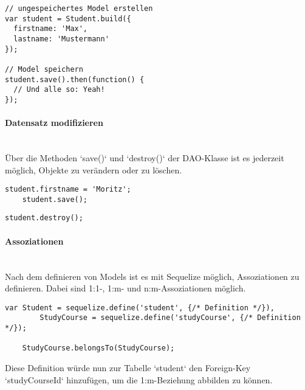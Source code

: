 \begin{lstlisting}[caption=Datensatz anlegen (Sequelize)]
// ungespeichertes Model erstellen
var student = Student.build({
  firstname: 'Max',
  lastname: 'Mustermann'
});

// Model speichern
student.save().then(function() {
  // Und alle so: Yeah!
});	
\end{lstlisting}


\paragraph{Datensatz modifizieren} \hspace{0pt} \\

Über die Methoden `save()` und `destroy()` der DAO-Klasse ist es jederzeit möglich, Objekte zu verändern oder zu löschen.

\begin{lstlisting}[caption=Datensatz ändern (Sequelize)]
	student.firstname = 'Moritz';
	student.save();
\end{lstlisting}

\begin{lstlisting}[caption=Datensatz löschen (Sequelize)]
	student.destroy();
\end{lstlisting}



\paragraph{Assoziationen} \hspace{0pt} \\

Nach dem definieren von Models ist es mit Sequelize möglich, Assoziationen zu definieren. Dabei sind 1:1-, 1:m- und n:m-Assoziationen möglich.

\begin{lstlisting}[caption=Datensatz anlegen (Sequelize)]
	var Student = sequelize.define('student', {/* Definition */}),
    	StudyCourse = sequelize.define('studyCourse', {/* Definition */});
	
	StudyCourse.belongsTo(StudyCourse);
\end{lstlisting}

\noindent Diese Definition würde nun zur Tabelle `student` den Foreign-Key `studyCourseId` hinzufügen, um die 1:m-Beziehung abbilden zu können.




